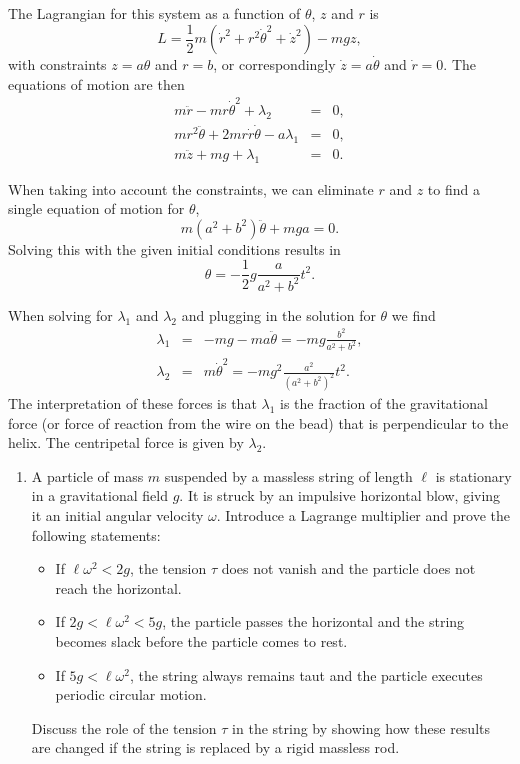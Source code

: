 \documentclass[letterpaper,11pt]{article}
\begin{document}
The Lagrangian for this system as a function of $\theta$, $z$ and $r$ is
\begin{equation*}
 L = \frac{1}{2} m \left( \dot{r}^2 + r^2 \dot{\theta}^2 + \dot{z}^2 \right) - m g z,
\end{equation*}
with constraints $z = a \theta$ and $r = b$, or correspondingly $\dot{z} = a\dot{\theta}$ and $\dot{r} = 0$.  The equations of motion are then
\begin{eqnarray*}
 m \ddot{r} - m r \dot{\theta}^2 + \lambda_2 & = & 0, \\
 m r^2 \ddot{\theta} + 2 m r \dot{r} \dot{\theta} - a \lambda_1 & = & 0, \\
 m \ddot{z} + m g + \lambda_1 & = & 0.
\end{eqnarray*}

When taking into account the constraints, we can eliminate $r$ and $z$ to find a single equation of motion for $\theta$,
\begin{equation*}
 m (a^2 + b^2) \ddot{\theta} + m g a = 0.
\end{equation*}
Solving this with the given initial conditions results in
\begin{equation*}
 \theta = - \frac{1}{2} g \frac{a}{a^2 + b^2} t^2.
\end{equation*}

When solving for $\lambda_1$ and $\lambda_2$ and plugging in the solution for $\theta$ we find
\begin{eqnarray*}
 \lambda_1 & = & - m g - m a \ddot{\theta} = - m g \frac{b^2}{a^2 + b^2}, \\
 \lambda_2 & = & m \dot{\theta}^2 = - m g^2 \frac{a^2}{(a^2+b^2)^2} t^2.
\end{eqnarray*}
The interpretation of these forces is that $\lambda_1$ is the fraction of the gravitational force (or force of reaction from the wire on the bead) that is perpendicular to the helix.  The centripetal force is given by $\lambda_2$.


\begin{enumerate}[resume]
 \item A particle of mass $m$ suspended by a massless string of length $\ell$ is stationary in a gravitational field $g$.  It is struck by an impulsive horizontal blow, giving it an initial angular velocity $\omega$.  Introduce a Lagrange multiplier and prove the following statements:
 \begin{itemize}
  \item If $\ell\omega^2 < 2g$, the tension $\tau$ does not vanish and the particle does not reach the horizontal.
  \item If $2g < \ell\omega^2 < 5g$, the particle passes the horizontal and the string becomes slack before the particle comes to rest.
  \item If $5g < \ell\omega^2$, the string always remains taut and the particle executes periodic circular motion.
 \end{itemize}
 Discuss the role of the tension $\tau$ in the string by showing how these results are changed if the string is replaced by a rigid massless rod.
\end{enumerate}
\end{document}

